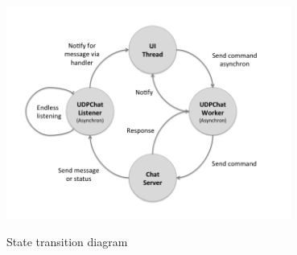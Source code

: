 \documentclass{report}
\newcommand{\lfig}[1]{\label{fig:#1}}
\begin{document}
\begin{figure}
    \centering
    \includegraphics[height=7cm]{std.png}
    \lfig{std}   
    \caption{State transition diagram}
\end{figure}
\end{document}
